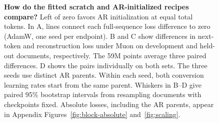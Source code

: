 \begin{figure}[!t]
\centering
\resizebox{\textwidth}{!}{}
\caption{\textbf{How do the fitted scratch and AR-initialized recipes compare?} Left of zero favors AR initialization at equal total tokens. In A, lines connect each full-sequence loss difference to zero (AdamW, one seed per endpoint). B and C show differences in next-token and reconstruction loss under Muon on development and held-out documents, respectively. The 59M points average three paired differences. D shows the pairs individually on both sets. The three seeds use distinct AR parents. Within each seed, both conversion learning rates start from the same parent. Whiskers in B--D give paired 95\% bootstrap intervals from resampling documents with checkpoints fixed. Absolute losses, including the AR parents, appear in Appendix Figures~\ref{fig:block-absolute} and~\ref{fig:scaling}.}
\label{fig:block-scaling}
\end{figure}
